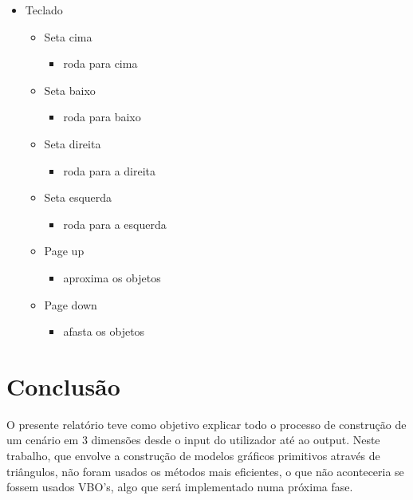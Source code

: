 \documentclass{report}
\begin{document}
\begin{itemize}
\begin{itemize}
    \end{itemize}
\item Teclado
    \begin{itemize}
        \item Seta cima
            \begin{itemize}
                \item roda para cima
            \end{itemize}
        \item Seta baixo
            \begin{itemize}
                \item roda para baixo
            \end{itemize}
        \item Seta direita
            \begin{itemize}
                \item roda para a direita
            \end{itemize}
        \item Seta esquerda
            \begin{itemize}
                \item roda para a esquerda
            \end{itemize}
        \item Page up
            \begin{itemize}
                \item aproxima os objetos
            \end{itemize}
        \item Page down
            \begin{itemize}
                \item afasta os objetos
            \end{itemize}
    \end{itemize}
\end{itemize}

\chapter{Conclus\~{a}o}
O presente relat\'orio teve como objetivo explicar todo o processo de constru\c{c}\~ao de um cen\'ario em 3 dimens\~oes desde o input do utilizador at\'e ao output.
Neste trabalho, que envolve a constru\c{c}\~ao de modelos gr\'aficos primitivos atrav\'es de tri\^angulos, n\~ao foram usados os m\'etodos mais eficientes, o que n\~ao aconteceria se fossem usados VBO's, algo que ser\'a implementado numa pr\'oxima fase. 
\newline
\appendix
\end{document}
